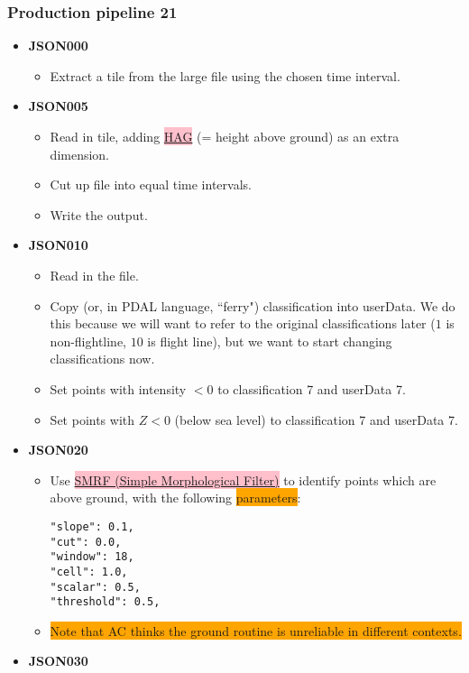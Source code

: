 \documentclass[a4paper,11pt,twoside]{article}
\theoremstyle{definition}
\theoremstyle{remark}
\newcommand{\sh}[1]{\colorbox{pink}{#1}}
\newcommand{\bad}[1]{\colorbox{orange}{#1}}
\begin{document}
\subsubsection{Production pipeline 21}
\begin{itemize}
\item \textbf{JSON000}
\begin{itemize}
\item Extract a tile from the large file using the chosen time interval.
\end{itemize}
\item \textbf{JSON005}
\begin{itemize}
\item Read in tile, adding \hyperref[smrf]{\sh{HAG}} (= height above ground) as an extra dimension.
\item Cut up file into equal time intervals.
\item Write the output.
\end{itemize}
\item \textbf{JSON010}
\begin{itemize}
\item Read in the file.
\item Copy (or, in PDAL language, ``ferry") classification into userData. We do this because we will want to refer to the original classifications later ($1$ is non-flightline, $10$ is flight line), but we want to start changing classifications now.
\item Set points with intensity $<0$ to classification 7 and userData 7.
\item Set points with $Z<0$ (below sea level) to classification 7 and userData 7.
\end{itemize}
\item \textbf{JSON020}
\begin{itemize}
\item Use \hyperref[smrf]{\sh{SMRF (Simple Morphological Filter)}} to identify points which are above ground, with the following \bad{parameters}:
\begin{center}
\begin{verbatim}
"slope": 0.1, 
"cut": 0.0,
"window": 18, 
"cell": 1.0, 
"scalar": 0.5, 
"threshold": 0.5, 
\end{verbatim}
\end{center}
\item \bad{Note that AC thinks the ground routine is unreliable in different contexts.}
\end{itemize}
\item \textbf{JSON030}

\end{itemize}
\end{document}
